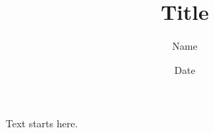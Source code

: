 \documentclass{article}
\title{Title}
\author{Name}
\date{Date}
\begin{document}
\maketitle

Text starts here.
\end{document}
